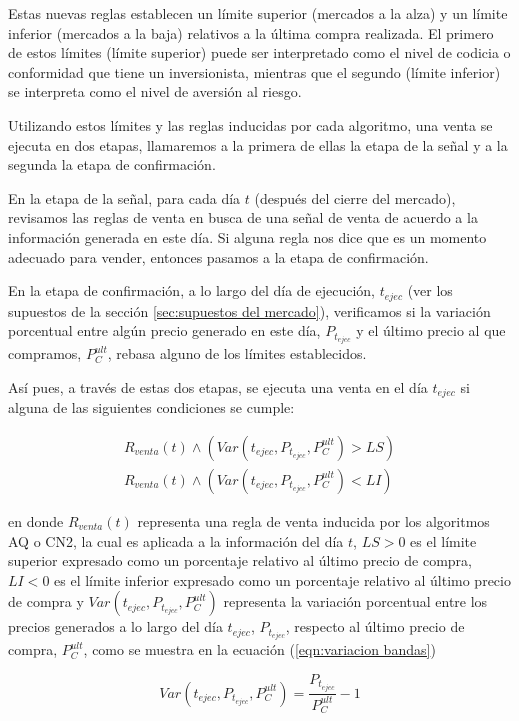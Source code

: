 \documentclass[12pt]{scrbook}
\theoremstyle{break}
\theoremstyle{break}
\begin{document}
Estas nuevas reglas establecen un límite superior (mercados a la alza) y un límite inferior (mercados a la baja) relativos a la última compra realizada. El primero de estos límites (límite superior) puede ser interpretado como el nivel de codicia o conformidad que tiene un inversionista, mientras que el segundo (límite inferior) se interpreta como el nivel de aversión al riesgo.

Utilizando estos límites y las reglas inducidas por cada algoritmo, una venta se ejecuta en dos etapas, llamaremos a la primera de ellas la etapa de la señal y a la segunda la etapa de confirmación.

En la etapa de la señal, para cada día $t$ (después del cierre del mercado), revisamos las reglas de venta en busca de una señal de venta de acuerdo a la información generada en este día. Si alguna regla nos dice que es un momento adecuado para vender, entonces pasamos a la etapa de confirmación.

En la etapa de confirmación, a lo largo del día de ejecución, $t_{ejec}$ (ver los supuestos de la sección \ref{sec:supuestos del mercado}), verificamos si la variación porcentual entre algún precio generado en este día, $P_{t_{ejec}}$ y el último precio al que compramos, $P_{C}^{ult}$, rebasa alguno de los límites establecidos.

Así pues, a través de estas dos etapas, se ejecuta una venta en el día $t_{ejec}$ si alguna de las siguientes condiciones se cumple:

\begin{align}
R_{venta}(t) \wedge (Var(t_{ejec}, P_{t_{ejec}}, P_{C}^{ult} ) > LS) \label{eqn:Venta limite sup}\\
R_{venta}(t) \wedge (Var(t_{ejec}, P_{t_{ejec}}, P_{C}^{ult} ) < LI) \label{eqn:Venta limite inf}
\end{align}

en donde $R_{venta}(t)$ representa una regla de venta inducida por los algoritmos AQ o CN2, la cual es aplicada a la información del día $t$, $LS>0$ es el límite superior expresado como un porcentaje relativo al último precio de compra, $LI<0$ es el límite inferior expresado como un porcentaje relativo al último precio de compra y $Var(t_{ejec}, P_{t_{ejec}}, P_{C}^{ult} )$ representa la variación porcentual entre los precios generados a lo largo del día $t_{ejec}$, $P_{t_{ejec}}$, respecto al último precio de compra, $P_{C}^{ult}$, como se muestra en la ecuación (\ref{eqn:variacion bandas})

\begin{equation} \label{eqn:variacion bandas}
Var(t_{ejec}, P_{t_{ejec}}, P_{C}^{ult} ) = \dfrac{P_{t_{ejec}}} {P_{C}^{ult}} - 1
\end{equation}
\end{document}
